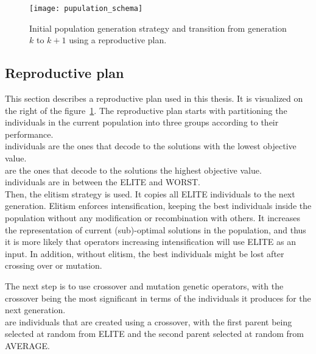 \begin{figure}[!h]
    \texttt{[image: pupulation\_schema]}
    \caption[Initial population generation strategy and transition]
    {Initial population generation strategy and transition from generation $k$ to $k+1$ using a reproductive plan.}
    \label{fig:population-schema}
\end{figure}


\newpage

\subsection{Reproductive plan}\label{subsec:reproductive-plan}
This section describes a reproductive plan used in this thesis.
It is visualized on the right of the figure~\ref{fig:population-schema}.
The reproductive plan starts with partitioning the individuals in the current
population into three groups according to their performance.\\

 individuals are the ones that decode to the solutions with the lowest objective value.\\

 are the ones that decode to the solutions the highest objective value.\\

 individuals are in between the ELITE and WORST.\\

Then, the elitism strategy is used.
It copies all ELITE individuals to the next generation.
Elitism enforces intensification, keeping the best individuals inside the population without any
modification or recombination with others.
It increases the representation of current (sub)-optimal solutions in the population, and thus it is
more likely that operators increasing intensification will use ELITE as an input.
In addition, without elitism, the best individuals might be lost after crossing over or mutation.

The next step is to use crossover and mutation genetic operators, with the crossover being
the most significant in terms of the individuals it produces for the next generation.\\

 are individuals that are created using a crossover, with the first parent being selected
at random from ELITE and the second parent selected at random from AVERAGE.\\

